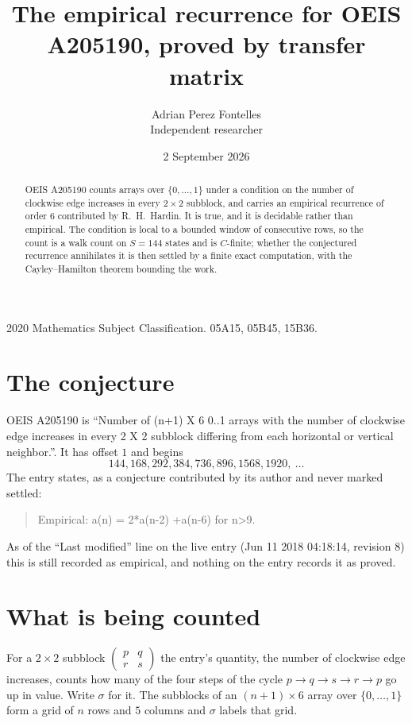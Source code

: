 \documentclass[11pt,a4paper]{article}
\title{The empirical recurrence for OEIS A205190, proved by transfer matrix}
\author{Adrian Perez Fontelles\\ \small Independent researcher}
\date{2 September 2026}
\theoremstyle{plain}
\theoremstyle{definition}
\begin{document}
\maketitle

\begin{abstract}
OEIS A205190 counts arrays over $\{0,\dots,1\}$ under a condition on the number of clockwise edge increases
in every $2\times2$ subblock, and carries an empirical recurrence of order $6$ contributed by
R.~H.~Hardin. It is true, and it is decidable rather than empirical. The condition is local to
a bounded window of consecutive rows, so the count is a walk count on $S=144$ states and is
$C$-finite; whether the conjectured recurrence annihilates it is then settled by a finite exact
computation, with the Cayley--Hamilton theorem bounding the work.
\end{abstract}

\noindent\small 2020 Mathematics Subject Classification. 05A15, 05B45, 15B36.\normalsize

\section{The conjecture}

OEIS A205190 is ``Number of (n+1) X 6 0..1 arrays with the number of clockwise edge increases in every 2 X 2 subblock differing from each horizontal or vertical neighbor.''. It has offset $1$ and begins
\[
144, 168, 292, 384, 736, 896, 1568, 1920,\ \dots
\]
The entry states, as a conjecture contributed by its author and never marked settled:
\begin{quote}
Empirical: a(n) = 2*a(n-2) +a(n-6) for n>9.
\end{quote}
As of the ``Last modified'' line on the live entry (Jun 11 2018 04:18:14, revision 8) this is still
recorded as empirical, and nothing on the entry records it as proved.

\section{What is being counted}

For a $2\times2$ subblock $\begin{pmatrix}p&q\\r&s\end{pmatrix}$ the
entry's quantity, the number of clockwise edge increases, counts how many of the four steps of the cycle $p\to q\to s\to r\to p$ go up in value. Write $\sigma$ for it. The subblocks of an
$(n+1)\times6$ array over $\{0,\dots,1\}$ form a grid of $n$ rows and $5$
columns and $\sigma$ labels that grid.
\end{document}
